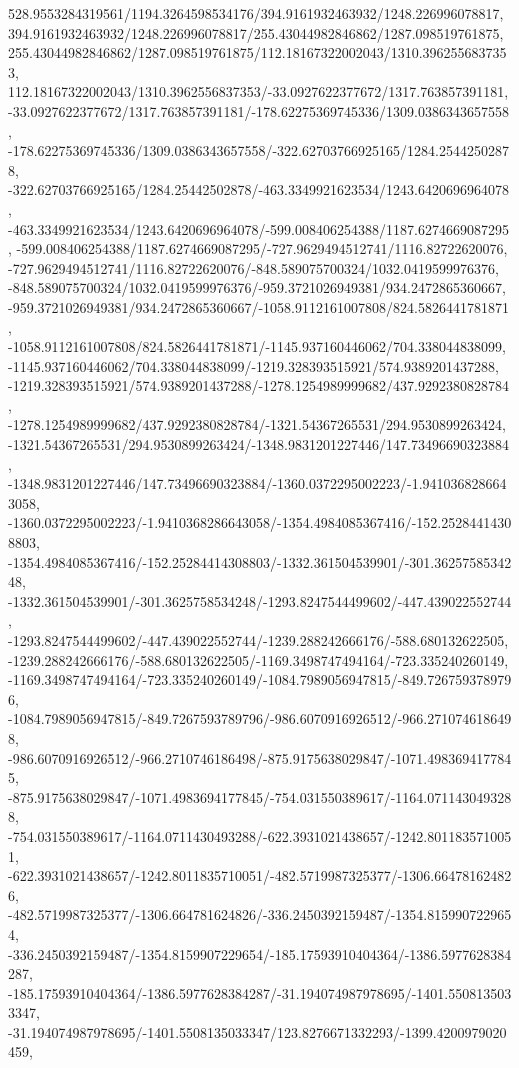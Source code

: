 {    528.9553284319561/1194.3264598534176/394.9161932463932/1248.226996078817,
    394.9161932463932/1248.226996078817/255.43044982846862/1287.098519761875,
    255.43044982846862/1287.098519761875/112.18167322002043/1310.3962556837353,
    112.18167322002043/1310.3962556837353/-33.0927622377672/1317.763857391181,
    -33.0927622377672/1317.763857391181/-178.62275369745336/1309.0386343657558,
    -178.62275369745336/1309.0386343657558/-322.62703766925165/1284.25442502878,
    -322.62703766925165/1284.25442502878/-463.3349921623534/1243.6420696964078,
    -463.3349921623534/1243.6420696964078/-599.008406254388/1187.6274669087295,
    -599.008406254388/1187.6274669087295/-727.9629494512741/1116.82722620076,
    -727.9629494512741/1116.82722620076/-848.589075700324/1032.0419599976376,
    -848.589075700324/1032.0419599976376/-959.3721026949381/934.2472865360667,
    -959.3721026949381/934.2472865360667/-1058.9112161007808/824.5826441781871,
    -1058.9112161007808/824.5826441781871/-1145.937160446062/704.338044838099,
    -1145.937160446062/704.338044838099/-1219.328393515921/574.9389201437288,
    -1219.328393515921/574.9389201437288/-1278.1254989999682/437.9292380828784,
    -1278.1254989999682/437.9292380828784/-1321.54367265531/294.9530899263424,
    -1321.54367265531/294.9530899263424/-1348.9831201227446/147.73496690323884,
    -1348.9831201227446/147.73496690323884/-1360.0372295002223/-1.9410368286643058,
    -1360.0372295002223/-1.9410368286643058/-1354.4984085367416/-152.25284414308803,
    -1354.4984085367416/-152.25284414308803/-1332.361504539901/-301.3625758534248,
    -1332.361504539901/-301.3625758534248/-1293.8247544499602/-447.439022552744,
    -1293.8247544499602/-447.439022552744/-1239.288242666176/-588.680132622505,
    -1239.288242666176/-588.680132622505/-1169.3498747494164/-723.335240260149,
    -1169.3498747494164/-723.335240260149/-1084.7989056947815/-849.7267593789796,
    -1084.7989056947815/-849.7267593789796/-986.6070916926512/-966.2710746186498,
    -986.6070916926512/-966.2710746186498/-875.9175638029847/-1071.4983694177845,
    -875.9175638029847/-1071.4983694177845/-754.031550389617/-1164.0711430493288,
    -754.031550389617/-1164.0711430493288/-622.3931021438657/-1242.8011835710051,
    -622.3931021438657/-1242.8011835710051/-482.5719987325377/-1306.664781624826,
    -482.5719987325377/-1306.664781624826/-336.2450392159487/-1354.8159907229654,
    -336.2450392159487/-1354.8159907229654/-185.17593910404364/-1386.5977628384287,
    -185.17593910404364/-1386.5977628384287/-31.194074987978695/-1401.5508135033347,
    -31.194074987978695/-1401.5508135033347/123.8276671332293/-1399.4200979020459,
}
